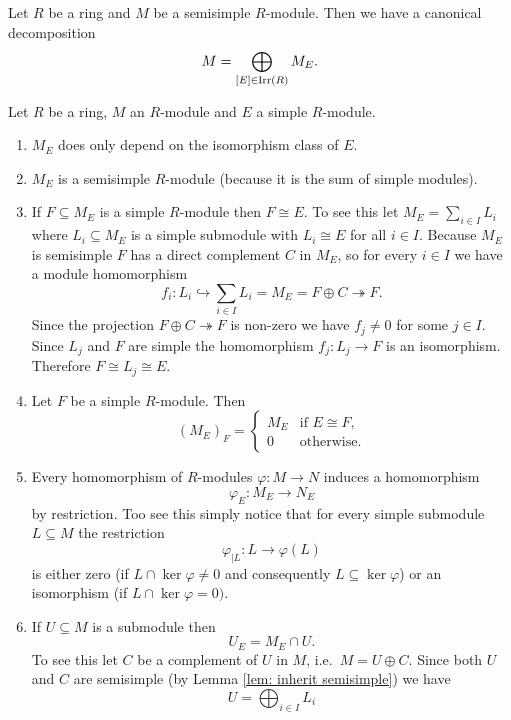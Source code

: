 \begin{cor}\label{cor: canonical decomposition semisimple module}
 Let $R$ be a ring and $M$ be a semisimple $R$-module. Then we have a canonical decomposition
 \[
  M = \bigoplus_{[E] \in \operatorname{Irr}(R)} M_E.
 \]
\end{cor}


\begin{rem}
  Let $R$ be a ring, $M$ an $R$-module and $E$ a simple $R$-module.
 \begin{enumerate}[label=\emph{\alph*})]
  \item
  $M_E$ does only depend on the isomorphism class of $E$.
  \item
  $M_E$ is a semisimple $R$-module (because it is the sum of simple modules).
  \item
  If $F \subseteq M_E$ is a simple $R$-module then $F \cong E$. To see this let $M_E = \sum_{i \in I} L_i$ where $L_i \subseteq M_E$ is a simple submodule with $L_i \cong E$ for all $i \in I$. Because $M_E$ is semisimple $F$ has a direct complement $C$ in $M_E$, so for every $i \in I$ we have a module homomorphism
  \[
   f_i \colon L_i \hookrightarrow \sum_{i \in I} L_i = M_E = F \oplus C \twoheadrightarrow F.
  \]
  Since the projection $F \oplus C \twoheadrightarrow F$ is non-zero we have $f_j \neq 0$ for some $j \in I$. Since $L_j$ and $F$ are simple the homomorphism $f_j \colon L_j \to F$ is an isomorphism. Therefore $F \cong L_j \cong E$.
  \item
  Let $F$ be a simple $R$-module. Then
  \[
   (M_E)_F =
   \begin{cases}
    M_E & \text{if } E \cong F, \\
      0 & \text{otherwise}.
   \end{cases}
  \]
  \item
  Every homomorphism of $R$-modules $\varphi \colon M \to N$ induces a homomorphism
  \[
   \varphi_E \colon M_E \to N_E
  \]
  by restriction. Too see this simply notice that for every simple submodule $L \subseteq M$ the restriction
  \[
   \varphi_{|L} \colon L \to \varphi(L)
  \]
  is either zero (if $L \cap \ker \varphi \neq 0$ and consequently $L \subseteq \ker \varphi$) or an isomorphism (if $L \cap \ker \varphi = 0)$.
  \item
  If $U \subseteq M$ is a submodule then
  \[
   U_E = M_E \cap U.
  \]
  To see this let $C$ be a complement of $U$ in $M$, i.e.\ $M = U \oplus C$. Since both $U$ and $C$ are semisimple (by Lemma \ref{lem: inherit semisimple}) we have
  \[
   U = \bigoplus_{i \in I} L_i
  \]

\end{enumerate}
\end{rem}
